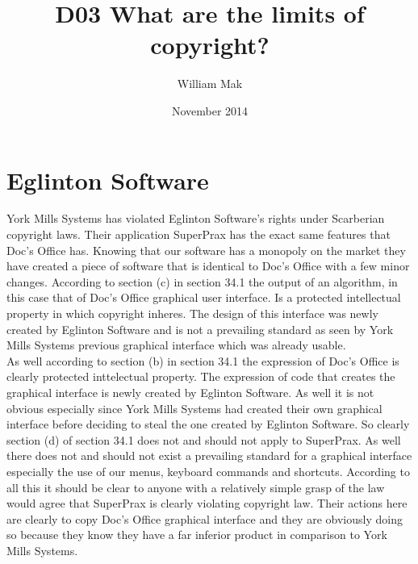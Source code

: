 \documentclass{article}
\title{D03 What are the limits of copyright?}
\author{William Mak}
\date{November 2014}
\begin{document}
\maketitle

\section{Eglinton Software}
York Mills Systems has violated Eglinton Software's rights under Scarberian
copyright laws. Their application SuperPrax has the exact same features that
Doc's Office has. Knowing that our software has a monopoly on the market they
have created a piece of software that is identical to Doc's Office with a few
minor changes. According to section (c) in section 34.1 the output of an
algorithm, in this case that of Doc's Office graphical user interface. Is a
protected intellectual property in which copyright inheres. The design of this
interface was newly created by Eglinton Software and is not a prevailing
standard as seen by York Mills Systems previous graphical interface which was
already usable.\\

As well according to section (b) in section 34.1 the expression of Doc's Office
is clearly protected inttelectual property. The expression of code that creates
the graphical interface is newly created by Eglinton Software. As well it is not
obvious especially since York Mills Systems had created their own graphical
interface before deciding to steal the one created by Eglinton Software. So 
clearly section (d) of section 34.1
does not and should not apply to SuperPrax. As well there does not and should
not exist a prevailing standard for a graphical interface especially the use of
our menus, keyboard commands and shortcuts. According to all this it should be
clear to anyone with a relatively simple grasp of the law would agree that
SuperPrax is clearly violating copyright law. Their actions here are clearly to
copy Doc's Office graphical interface and they are obviously doing so because
they know they have a far inferior product in comparison to York Mills Systems.
\end{document}
